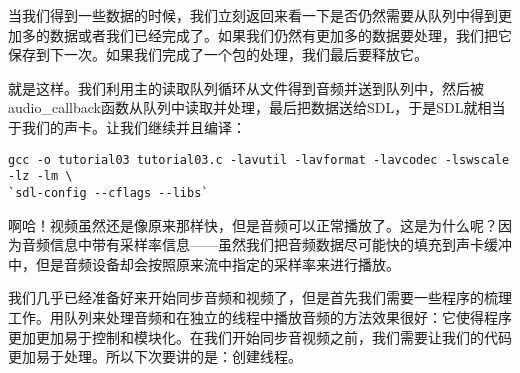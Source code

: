当我们得到一些数据的时候，我们立刻返回来看一下是否仍然需要从队列中得到更加多的数据或者我们已经完成了。如果我们仍然有更加多的数据要处理，我们把它保存到下一次。如果我们完成了一个包的处理，我们最后要释放它。

就是这样。我们利用主的读取队列循环从文件得到音频并送到队列中，然后被audio_callback函数从队列中读取并处理，最后把数据送给SDL，于是SDL就相当于我们的声卡。让我们继续并且编译：

\begin{lstlisting}
gcc -o tutorial03 tutorial03.c -lavutil -lavformat -lavcodec -lswscale -lz -lm \
`sdl-config --cflags --libs`
\end{lstlisting}

啊哈！视频虽然还是像原来那样快，但是音频可以正常播放了。这是为什么呢？因为音频信息中带有采样率信息——虽然我们把音频数据尽可能快的填充到声卡缓冲中，但是音频设备却会按照原来流中指定的采样率来进行播放。

我们几乎已经准备好来开始同步音频和视频了，但是首先我们需要一些程序的梳理工作。用队列来处理音频和在独立的线程中播放音频的方法效果很好：它使得程序更加更加易于控制和模块化。在我们开始同步音视频之前，我们需要让我们的代码更加易于处理。所以下次要讲的是：创建线程。
